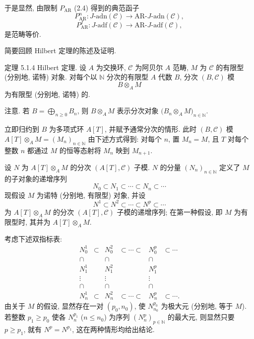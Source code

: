 于是显然, 由限制 \(P_{\mathrm{AR}}\) (2.4) 得到的典范函子
\[
P^n_{\mathrm{AR}}:J\text{-adn}(\mathcal C)\longrightarrow \mathrm{AR}\text{-}J\text{-adn}(\mathcal C),
\]
\[
P^f_{\mathrm{AR}}:J\text{-adf}(\mathcal C)\longrightarrow \mathrm{AR}\text{-}J\text{-adf}(\mathcal C),
\]
是范畴等价.

简要回顾 Hilbert 定理的陈述及证明.

\begin{statement}{定理 5.1.4}
Hilbert 定理. 设 \(A\) 为交换环, \(\mathcal C\) 为阿贝尔 \(A\) 范畴, \(M\) 为 \(\mathcal C\) 的有限型 (分别地, 诺特) 对象. 对每个以 \(\mathbb N\) 分次的有限型 \(A\) 代数 \(B\), 分次 \((B,\mathcal C)\) 模
\[
B\otimes_A M
\]
为有限型 (分别地, 诺特) 的.

注意. 若 \(B=\bigoplus_{n\ge0}B_n\), 则 \(B\otimes_A M\) 表示分次对象 \(\bigl(B_n\otimes_A M\bigr)_{n\in\mathbb N}\).
\end{statement}

\begin{prooftext}
立即归约到 \(B\) 为多项式环 \(A[T]\), 并赋予通常分次的情形. 此时 \((B,\mathcal C)\) 模 \(A[T]\otimes_A M=(M_n)_{n\in\mathbb N}\) 由下述方式得到: 对每个 \(n\), 置 \(M_n=M\), 且 \(T\) 对每个整数 \(n\) 都通过 \(M\) 的恒等态射将 \(M_n\) 映到 \(M_{n+1}\).

设 \(N\) 为 \(A[T]\otimes_A M\) 的分次 \((A[T],\mathcal C)\) 子模. \(N\) 的分量 \((N_n)_{n\in\mathbb N}\) 定义了 \(M\) 的子对象的递增序列
\[
N_0\subset N_1\subset\cdots\subset N_n\subset\cdots
\]
现假设 \(M\) 为诺特 (分别地, 有限型) 对象, 并设
\[
N^1\subset N^2\subset\cdots\subset N^p\subset\cdots
\]
为 \(A[T]\otimes_A M\) 的分次 \((A[T],\mathcal C)\) 子模的递增序列; 在第一种假设, 即 \(M\) 为有限型时, 其并为 \(A[T]\otimes_A M\).

考虑下述双指标表:
\[
\begin{array}{cccccc}
N_0^1&\subset&N_0^2&\subset\cdots\subset&N_0^p&\subset\cdots\\
\cap&&\cap&&\cap\\
N_1^1&&N_1^2&&N_1^p\\
\vdots&&\vdots&&\vdots\\
\cap&&\cap&&\cap\\
N_n^1&\subset&N_n^2&\subset\cdots\subset&N_n^p&\subset\cdots .
\end{array}
\]
由关于 \(M\) 的假设, 显然存在一对 \((p_0,n_0)\), 使 \(N^{p_0}_{n_0}\) 为极大元 (分别地, 等于 \(M\)). 若整数 \(p_1\ge p_0\) 使各 \(N_n^{p_1}\) (\(n\le n_0\)) 为序列 \((N_n^p)_{p\in\mathbb N}\) 的最大元, 则显然只要 \(p\ge p_1\), 就有 \(N^p=N^{p_1}\), 这在两种情形均给出结论.
\end{prooftext}

